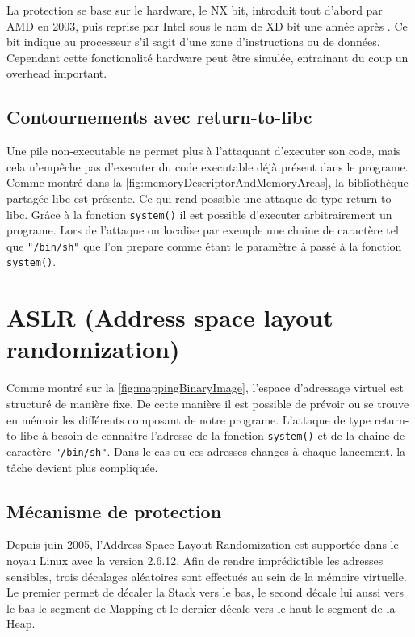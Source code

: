 La protection se base sur le hardware, le NX bit, introduit tout d'abord par AMD en 2003, puis reprise par Intel sous le nom de XD bit une année après \cite{ExecutableSpaceProtection} \cite{NXBit}. Ce bit indique au processeur s'il sagit d'une zone d'instructions ou de données. Cependant cette fonctionalité hardware peut être simulée, entrainant du coup un overhead important.

\subsection{Contournements avec return-to-libc}

Une pile non-executable ne permet plus à l'attaquant d'executer son code, mais cela n'empêche pas d'executer du code executable déjà présent dans le programe. Comme montré dans la \autoref{fig:memoryDescriptorAndMemoryAreas}, la bibliothèque partagée libc est présente. Ce qui rend possible une attaque de type return-to-libc\cite{ReturntolibcAttack}. Grâce à la fonction \texttt{system()} il est possible d'executer arbitrairement un programe. Lors de l'attaque on localise par exemple une chaine de caractère tel que \texttt{"/bin/sh"} que l'on prepare comme étant le paramètre à passé à la fonction  \texttt{system()}.

\section{ASLR (Address space layout randomization)}

Comme montré sur la \autoref{fig:mappingBinaryImage}, l'espace d'adressage virtuel est structuré de manière fixe. De cette manière il est possible de prévoir ou se trouve en mémoir les différents composant de notre programe. L'attaque de type return-to-libc à besoin de connaitre l'adresse de la fonction \texttt{system()} et de la chaine de caractère \texttt{"/bin/sh"}. Dans le cas ou ces adresses changes à chaque lancement, la tâche devient plus compliquée.

\newpage

\subsection{Mécanisme de protection}

Depuis juin 2005, l'Address Space Layout Randomization est supportée dans le noyau Linux avec la version 2.6.12. Afin de rendre imprédictible les adresses sensibles, trois décalages aléatoires sont effectués au sein de la mémoire virtuelle. Le premier permet de décaler la Stack vers le bas, le second décale lui aussi vers le bas le segment de Mapping et le dernier décale vers le haut le segment de la Heap.

